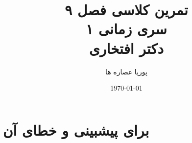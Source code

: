 \documentclass[a5paper,10pt]{article}
\author{پوریا عصاره ها}
\title{
    تمرین کلاسی فصل ۹\\
    سری زمانی ۱ \\
    دکتر افتخاری
}
\date{\today}
\begin{document}
\maketitle

\section*{برای  پیشبینی و خطای آن}
\end{document}
